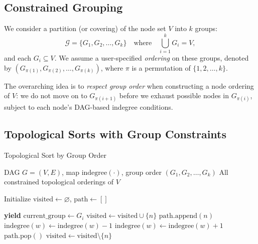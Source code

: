\subsection{Constrained Grouping}
We consider a partition (or covering) of the node set $V$ into $k$ groups: 
\[
  \mathcal{G} = \{G_1, G_2, \dots, G_k\} 
  \quad \text{where} \quad
  \bigcup_{i=1}^{k} G_i = V, 
\]
and each $G_i \subseteq V$. We assume a user-specified \emph{ordering} on these groups, denoted by $(G_{\pi(1)}, G_{\pi(2)}, \dots, G_{\pi(k)})$, where $\pi$ is a permutation of $\{1,2,\ldots,k\}$. 

The overarching idea is to \emph{respect group order} when constructing a node ordering of $V$: we do not move on to $G_{\pi(i+1)}$ before we exhaust possible nodes in $G_{\pi(i)}$, subject to each node's DAG-based indegree conditions.

\subsection{Topological Sorts with Group Constraints}
\label{sec:topo-group}
\begin{algorithm}[H]
\caption{Topological Sort by Group Order}
\label{alg:topological-sorts-by-group}
\begin{algorithmic}[1]
\Require DAG $G=(V,E)$,  map $\text{indegree}(\cdot)$, group order $(G_1, G_2, \dots, G_k)$
\Ensure All constrained topological orderings of $V$

\State Initialize $\text{visited} \gets \varnothing$, $\text{path} \gets []$

        \State \textbf{yield}  
        \State \Return
    \EndIf
    \State $\text{current\_group} \gets G_i$
            \State $\text{visited} \gets \text{visited} \cup \{n\}$
            \State $\text{path}.\text{append}(n)$
                \State $\text{indegree}(w) \gets \text{indegree}(w) - 1$
            \EndFor
            \State {}
                \State $\text{indegree}(w) \gets \text{indegree}(w) + 1$
            \EndFor
            \State $\text{path}.\text{pop}()$
            \State $\text{visited} \gets \text{visited} \setminus \{n\}$
        \EndIf
    \EndFor
        \State {}
    \EndIf
\EndFunction

\State {}

\end{algorithmic}
\end{algorithm}

